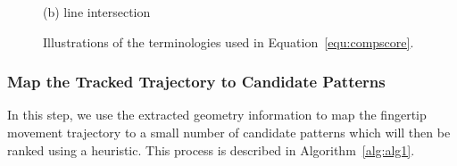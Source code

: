 \begin{figure}[!t]
{\begin{minipage}[t]{0.11\textwidth}
            \centering  (b) line intersection
        \end{minipage}
    }
    \hspace{0.1cm}
    \caption{Illustrations of the terminologies used in Equation~\ref{equ:compscore}.}
    \label{fig:intersection-overlap}
\end{figure}

    \subsubsection{Map the Tracked Trajectory to Candidate Patterns\label{section:identity}}
       In this step, we use the extracted geometry information to map the fingertip movement trajectory to a small number of candidate patterns which will then be ranked using a heuristic. This process is described in Algorithm~\ref{alg:alg1}.

